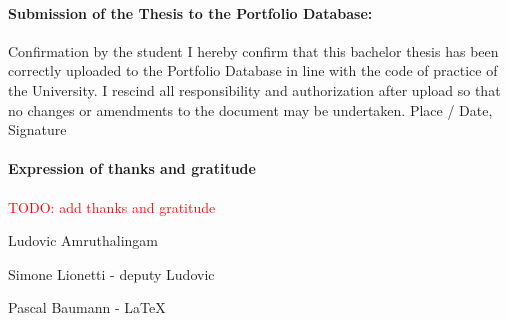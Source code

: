 \documentclass[a4paper,10.5pt,
			   bindingoffset=0.2in,left=3.35cm,right=2.12cm,top=3.75cm,bottom=2.88cm,%
				footskip=.25in
				listof=numbered,toc=chapterentrywithdots]{scrreport}
\renewcommand{\todo}[1]{\textcolor{red}{TODO: #1}}
\begin{document}
	\paragraph{\textbf{Submission of the Thesis to the Portfolio Database:}}
	
	Confirmation by the student \newline
	I hereby confirm that this bachelor thesis has been correctly uploaded to the Portfolio Database in line with the code of practice of the University. I rescind all responsibility and authorization after upload so that no changes or amendments to the document may be undertaken.  \newline \newline
	Place / Date, Signature	\underline{\hspace*{8cm}} \newline
	
	\newpage
	\paragraph{\textbf{Expression of thanks and gratitude}}
	
	\todo{add thanks and gratitude}
	
	Ludovic Amruthalingam
	
	Simone Lionetti - deputy Ludovic
	
	Pascal Baumann - LaTeX
	
	\newpage
	\begin{abstract}
		\todo{Your abstract here.}
	\end{abstract}
	
	\tableofcontents
	\listoftodos
	
\end{document}
